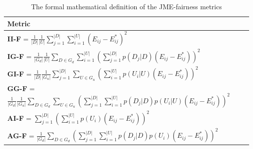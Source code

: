 \begin{table}
\centering
\begin{tabular}{l}
\hline
\textbf{Metric} \\
\hline
\textbf{II-F} = $\frac{1}{|D|} \frac{1}{|U|} \sum\limits_{j=1}^{|D|} \sum\limits_{i=1}^{|U|} (E_{ij} - E^*_{ij})^2$  \\
\textbf{IG-F} = $\frac{1}{|G_d|} \frac{1}{|U|} \sum\limits_{D \in G_d} \sum\limits_{i=1}^{|U|} (\sum\limits_{j=1}^{|D|} p(D_j|D)(E_{ij} - E^*_{ij}))^2$ \\
\textbf{GI-F} = $\frac{1}{|D|} \frac{1}{|G_u|} \sum\limits_{j=1}^{|D|} \sum\limits_{U \in G_u} (\sum\limits_{i=1}^{|U|} p(U_i|U)(E_{ij} - E^*_{ij}))^2$ \\
\textbf{GG-F} = $\frac{1}{|G_d|} \frac{1}{|G_u|} \sum\limits_{D \in G_d} \sum\limits_{U \in G_u} (\sum\limits_{j=1}^{|D|} \sum\limits_{i=1}^{|U|} p(D_j|D) p(U_i|U)(E_{ij} - E^*_{ij}))^2$ \\
\textbf{AI-F} = $\sum\limits_{j=1}^{|D|} (\sum\limits_{i=1}^{|U|} p(U_i)(E_{ij} - E^*_{ij}))^2$ \\
\textbf{AG-F} = $\frac{1}{|G_d|}\sum\limits_{D \in G_d}(\sum\limits_{j=1}^{|D|} \sum\limits_{i=1}^{|U|} p(D_j|D)p(U_i)(E_{ij} - E^*_{ij}))^2$ \\
\hline
\end{tabular}
\caption{\label{metric_def}
The formal mathematical definition of the JME-fairness metrics
}
\vspace{-5mm}
\end{table}

